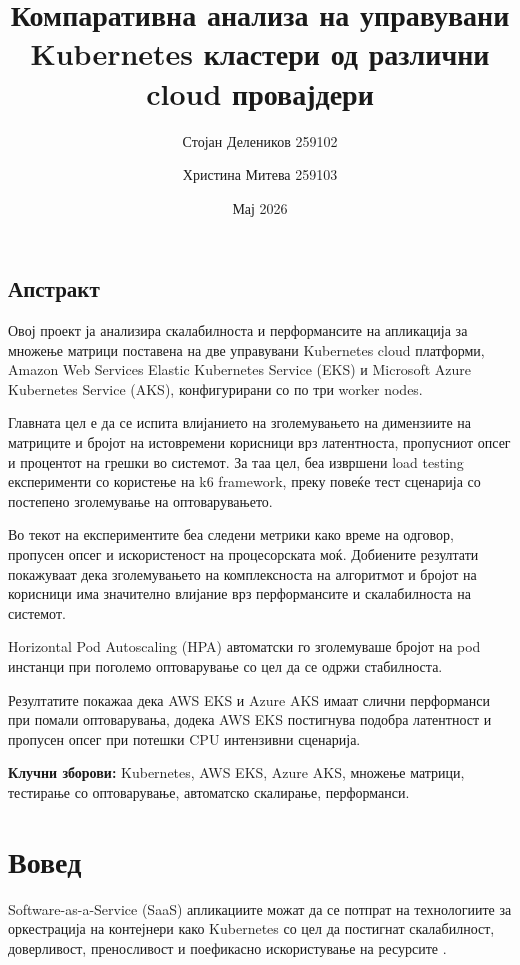 \documentclass{article}
\title{Компаративна анализа на управувани Kubernetes кластери од различни cloud провајдери}
\author{Стојан Делеников 259102 \and
Христина Митева 259103}
\date{Мај 2026}
\begin{document}
\maketitle

\subsection*{Апстракт}

Овој проект ја анализира скалабилноста и перформансите на апликација за множење матрици поставена на две управувани Kubernetes cloud платформи, Amazon Web Services Elastic Kubernetes Service (EKS) и Microsoft Azure Kubernetes Service (AKS), конфигурирани со по три worker nodes.

Главната цел е да се испита влијанието на зголемувањето на димензиите на матриците и бројот на истовремени корисници врз латентноста, пропусниот опсег и процентот на грешки во системот. За таа цел, беа извршени load testing експерименти со користење на k6 framework, преку повеќе тест сценарија со постепено зголемување на оптоварувањето.

Во текот на експериментите беа следени метрики како време на одговор, пропусен опсег и искористеност на процесорската моќ. Добиените резултати покажуваат дека зголемувањето на комплексноста на алгоритмот и бројот на корисници има значително влијание врз перформансите и скалабилноста на системот.

Horizontal Pod Autoscaling (HPA) автоматски го зголемуваше бројот на pod инстанци при поголемо оптоварување со цел да се одржи стабилноста. 

Резултатите покажаа дека AWS EKS и Azure AKS имаат слични перформанси при помали оптоварувања, додека AWS EKS постигнува подобра латентност и пропусен опсег при потешки CPU интензивни сценарија.


\noindent\textbf{Клучни зборови:} Kubernetes, AWS EKS, Azure AKS, множење матрици, тестирање со оптоварување, автоматско скалирање, перформанси.

\section{Вовед}

Software-as-a-Service (SaaS) апликациите можат да се потпрат на технологиите за оркестрација на контејнери како Kubernetes со цел да постигнат скалабилност, доверливост, преносливост и поефикасно искористување на ресурсите \cite{kubernetesOverview}. 
\end{document}
